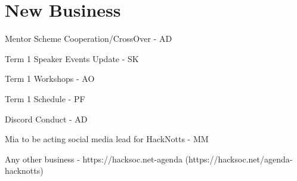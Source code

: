 \documentclass[11pt,agenda]{meetingmins}
\begin{document}
\section{New Business}
\begin{items}
	\item Mentor Scheme Cooperation/CrossOver - AD
	\item Term 1 Speaker Events Update - SK
	\item Term 1 Workshops - AO
	\item Term 1 Schedule - PF
	\item Discord Conduct - AD
	\item Mia to be acting social media lead for HackNotts - MM
	\item Any other business - https://hacksoc.net-agenda (https://hacksoc.net/agenda-hacknotts)
\end{items}

\vspace{1em}
\nextmeeting{}
\end{document}
